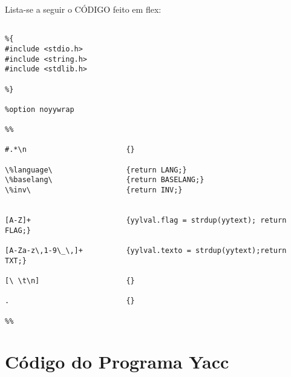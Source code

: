 \documentclass[11pt,a4paper]{report}%
\begin{document}
Lista-se a seguir o CÓDIGO feito em flex:
\begin{verbatim}

%{
#include <stdio.h>
#include <string.h>
#include <stdlib.h>

%}

%option noyywrap

%%

#.*\n 						{}                         

\%language\ 				{return LANG;}
\%baselang\ 				{return BASELANG;}
\%inv\ 						{return INV;}
                          

[A-Z]+						{yylval.flag = strdup(yytext); return FLAG;}

[A-Za-z\,1-9\_\,]+			{yylval.texto = strdup(yytext);return TXT;}

[\ \t\n]					{}

. 							{}

%%

\end{verbatim}

\chapter{Código do Programa Yacc}
\end{document}
